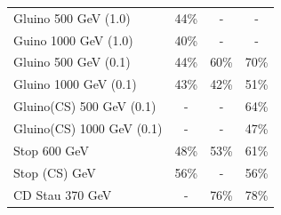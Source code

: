 \begin{table}
\begin{center}
\begin{tabular}{|l|c|c|c|}


Gluino 500 GeV (1.0)   & 44\% & -    & -  \\
Guino 1000 GeV (1.0)   & 40\% & -    & - \\ 
Gluino 500 GeV (0.1)   & 44\% & 60\%    & 70\% \\
Gluino 1000 GeV (0.1)  & 43\% & 42\% & 51\% \\
Gluino(CS) 500 GeV (0.1)   & -    & -    & 64\% \\
Gluino(CS) 1000 GeV (0.1)   & -    & -    & 47\% \\
Stop 600 GeV     & 48\% & 53\% & 61\% \\
Stop (CS) GeV    & 56\% & -    & 56\% \\
CD Stau 370 GeV    & -    & 76\%    & 78\% \\
\hline
   \end{tabular}
 \end{center}
\end{table}


